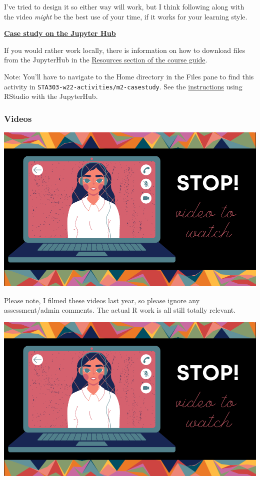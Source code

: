 \documentclass[
  openany]{book}
\begin{document}
I've tried to design it so either way will work, but I think following along with the video \emph{might} be the best use of your time, if it works for your learning style.

\href{https://jupyter.utoronto.ca/hub/user-redirect/git-pull?repo=https\%3A\%2F\%2Fgithub.com\%2Fsta303-bolton\%2Fsta303-w22-activities\&urlpath=rstudio\%2F\&branch=master}{\textbf{Case study on the Jupyter Hub}}

If you would rather work locally, there is information on how to download files from the JupyterHub in the \protect\hyperlink{using-rstudio-with-the-jupyterhub}{Resources section of the course guide}.

Note: You'll have to navigate to the Home directory in the Files pane to find this activity in \texttt{STA303-w22-activities/m2-casestudy}. See the \protect\hyperlink{using-rstudio-with-the-jupyterhub}{instructions} using RStudio with the JupyterHub.

\hypertarget{videos}{%
\subsubsection{Videos}\label{videos}}

\begin{center}\includegraphics[width=0.6\linewidth]{images/stop-video} \end{center}

Please note, I filmed these videos last year, so please ignore any assessment/admin comments. The actual R work is all still totally relevant.

\begin{center}\includegraphics[width=0.6\linewidth]{images/stop-video} \end{center}
\end{document}
